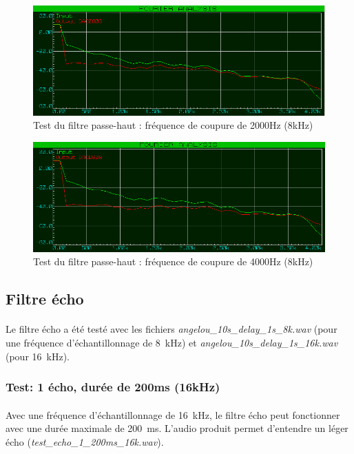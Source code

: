 \documentclass{article}
\begin{document}
    \begin{figure}[H]
        \centering
        \includegraphics[width=.75\textwidth]{./images/spectrum_high_pass_2000_8k.png}
        \caption{Test du filtre passe-haut : fréquence de coupure de 2000Hz (8kHz)}
    \end{figure}
    \begin{figure}[H]
        \centering
        \includegraphics[width=.75\textwidth]{./images/spectrum_high_pass_4000_8k.png}
        \caption{Test du filtre passe-haut : fréquence de coupure de 4000Hz (8kHz)}
    \end{figure}


    \subsection{Filtre écho}
    \paragraph{}
    Le filtre écho a été testé avec les fichiers \emph{angelou\_10s\_delay\_1s\_8k.wav} (pour une fréquence d'échantillonnage de \SI{8}{\kilo\hertz}) et \emph{angelou\_10s\_delay\_1s\_16k.wav} (pour \SI{16}{\kilo\hertz}).

    \subsubsection{Test: 1 écho, durée de 200ms (16kHz)}
    \paragraph{}
    Avec une fréquence d'échantillonnage de \SI{16}{\kilo\hertz}, le filtre écho peut fonctionner avec une durée maximale de \SI{200}{\milli\second}. L'audio produit permet d'entendre un léger écho (\emph{test\_echo\_1\_200ms\_16k.wav}).
\end{document}
